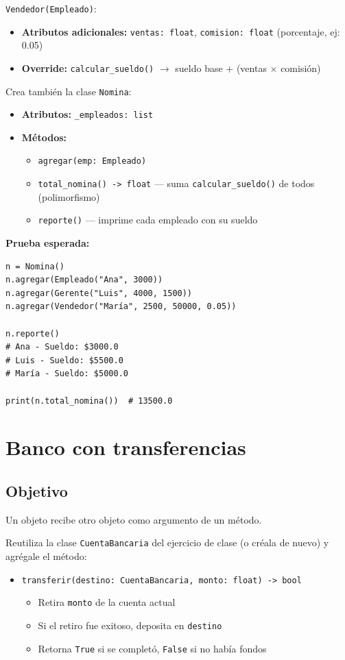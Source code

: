 \documentclass[11pt,letterpaper]{article}
\begin{document}
\texttt{Vendedor(Empleado)}:
\begin{itemize}[nosep]
  \item \textbf{Atributos adicionales:} \texttt{ventas: float}, \texttt{comision: float} (porcentaje, ej: 0.05)
  \item \textbf{Override:} \texttt{calcular\_sueldo()} $\to$ sueldo base + (ventas $\times$ comisión)
\end{itemize}

Crea también la clase \texttt{Nomina}:
\begin{itemize}[nosep]
  \item \textbf{Atributos:} \texttt{\_empleados: list}
  \item \textbf{Métodos:}
  \begin{itemize}[nosep]
    \item \texttt{agregar(emp: Empleado)}
    \item \texttt{total\_nomina() -> float} --- suma \texttt{calcular\_sueldo()} de todos (polimorfismo)
    \item \texttt{reporte()} --- imprime cada empleado con su sueldo
  \end{itemize}
\end{itemize}

\textbf{Prueba esperada:}
\begin{lstlisting}
n = Nomina()
n.agregar(Empleado("Ana", 3000))
n.agregar(Gerente("Luis", 4000, 1500))
n.agregar(Vendedor("María", 2500, 50000, 0.05))

n.reporte()
# Ana - Sueldo: $3000.0
# Luis - Sueldo: $5500.0
# María - Sueldo: $5000.0

print(n.total_nomina())  # 13500.0
\end{lstlisting}

\section{Banco con transferencias}
\subsection{Objetivo} Un objeto recibe otro objeto como argumento de un método.

Reutiliza la clase \texttt{CuentaBancaria} del ejercicio de clase (o créala de nuevo) y agrégale el método:
\begin{itemize}[nosep]
  \item \texttt{transferir(destino: CuentaBancaria, monto: float) -> bool}
  \begin{itemize}[nosep]
    \item Retira \texttt{monto} de la cuenta actual
    \item Si el retiro fue exitoso, deposita en \texttt{destino}
    \item Retorna \texttt{True} si se completó, \texttt{False} si no había fondos
  \end{itemize}
\end{itemize}
\end{document}
